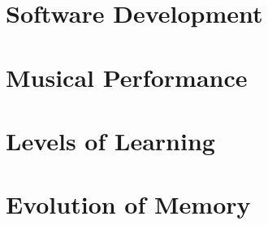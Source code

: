 \documentclass[10pt,titlepage]{article}
\begin{document}
\section{Software Development}

\section{Musical Performance}

\section{Levels of Learning}

\section{Evolution of Memory}

\cite{murray2019evolutionary}

{}








\end{document}
